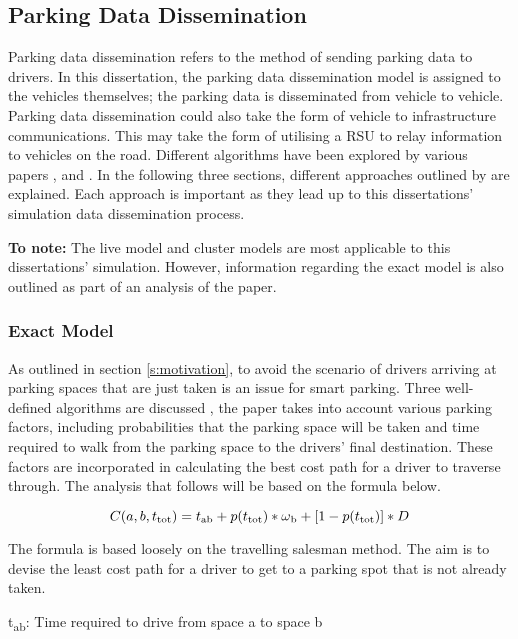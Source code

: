 \subsection{Parking Data Dissemination}\label{sec:data_dissemination}
Parking data dissemination refers to the method of sending parking data to drivers. In this dissertation, the parking data dissemination model is assigned to the vehicles themselves; the parking data is disseminated from vehicle to vehicle. Parking data dissemination could also take the form of vehicle to infrastructure communications. This may take the form of utilising a \ac{RSU} to relay information to vehicles on the road. Different algorithms have been explored by various papers  \citep{Schlote2014Delay-tolerantAssignment}, \citep{Verroios2011ReachingNetworking} and \citep{Lin2008SecurityNetworks}. In the following three sections, different approaches outlined by \citep{Verroios2011ReachingNetworking} are explained. Each approach is important as they lead up to this dissertations' simulation data dissemination process.

\textbf{To note:} The live model and cluster models are most applicable to this dissertations' simulation. However, information regarding the exact model is also outlined as part of an analysis of the paper.

\subsubsection{Exact Model}\label{sssec:exact}
As outlined in section \ref{s:motivation}, to avoid the scenario of drivers arriving at parking spaces that are just taken is an issue for smart parking. Three well-defined algorithms are discussed \citep{Verroios2011ReachingNetworking}, the paper takes into account various parking factors, including probabilities that the parking space will be taken and time required to walk from the parking space to the drivers' final destination. These factors are incorporated in calculating the best cost path for a driver to traverse through. The analysis that follows will be based on the formula below. 

\[ C(a,b,t\textsubscript{tot}) = t\textsubscript{ab} + p(t\textsubscript{tot}) * \omega\textsubscript{b} + [1 - p(t\textsubscript{tot})] * D\]

The formula is based loosely on the travelling salesman method. The aim is to devise the least cost path for a driver to get to a parking spot that is not already taken.

t\textsubscript{ab}: Time required to drive from space a to space b

